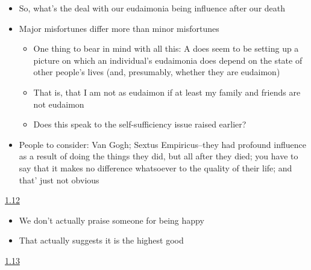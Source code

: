 \documentclass[11pt]{article}
\begin{document}
\begin{itemize}

\item{So, what's the deal with our eudaimonia being influence after our death}\item{Major misfortunes differ more than minor misfortunes}\begin{itemize}\item{One thing to bear in mind with all this: A does seem to be setting up a picture on which an individual's eudaimonia does depend on the state of other people's lives (and, presumably, whether they are eudaimon)}\item{That is, that I am not as eudaimon if at least my family and friends are not eudaimon}\item{Does this speak to the self-sufficiency issue raised earlier?}\end{itemize}\item{People to consider: Van Gogh; Sextus Empiricus--they had profound influence as a result of doing the things they did, but all after they died; you have to say that it makes no difference whatsoever to the quality of their life; and that' just not obvious}

\end{itemize}

\noindent\underline{1.12}

\begin{itemize}\item{We don't actually praise someone for being happy}\item{That actually suggests it is the highest good}\end{itemize}

\noindent\underline{1.13}
\end{document}

